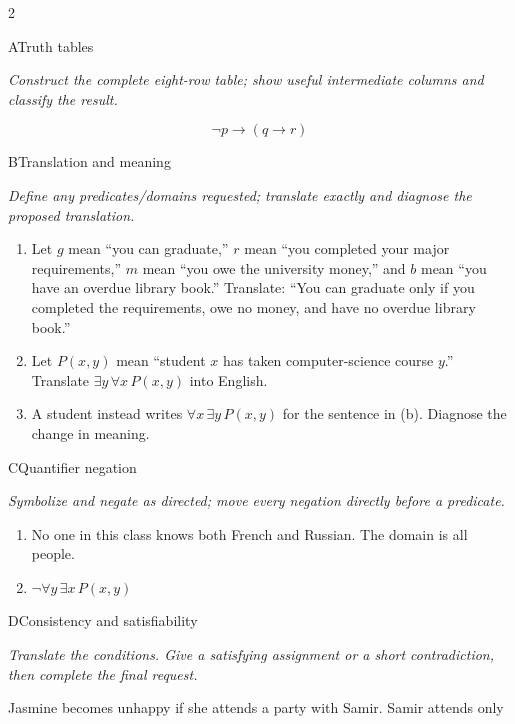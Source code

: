 \documentclass[9pt]{extarticle}
\begin{document}
\CoreWorkArea
\FormBreak
{}
\begin{multicols}{2}
\begin{CoreProblem}{A}{Truth tables}
{\scriptsize\textit{Construct the complete eight-row table; show useful intermediate columns and classify the result.}\par}
\[
  \neg p\to(q\to r)
\]
\end{CoreProblem}
\begin{CoreProblem}{B}{Translation and meaning}
{\scriptsize\textit{Define any predicates/domains requested; translate exactly and diagnose the proposed translation.}\par}
\begin{enumerate}[label=(\alph*)]
  \item Let $g$ mean ``you can graduate,'' $r$ mean ``you completed your major
        requirements,'' $m$ mean ``you owe the university money,'' and $b$
        mean ``you have an overdue library book.'' Translate: ``You can
        graduate only if you completed the requirements, owe no money, and
        have no overdue library book.''
  \item Let $P(x,y)$ mean ``student $x$ has taken computer-science course
        $y$.'' Translate $\exists y\,\forall x\,P(x,y)$ into English.
  \item A student instead writes $\forall x\,\exists y\,P(x,y)$ for the
        sentence in (b). Diagnose the change in meaning.
\end{enumerate}
\end{CoreProblem}
\begin{CoreProblem}{C}{Quantifier negation}
{\scriptsize\textit{Symbolize and negate as directed; move every negation directly before a predicate.}\par}
\begin{enumerate}[label=(\alph*)]
  \item No one in this class knows both French and Russian. The domain is all
        people.
  \item $\neg\forall y\,\exists x\,P(x,y)$
\end{enumerate}
\end{CoreProblem}
\columnbreak
\begin{CoreProblem}{D}{Consistency and satisfiability}
{\scriptsize\textit{Translate the conditions. Give a satisfying assignment or a short contradiction, then complete the final request.}\par}
Jasmine becomes unhappy if she attends a party with Samir. Samir attends only

\end{CoreProblem}
\end{multicols}
\end{document}
